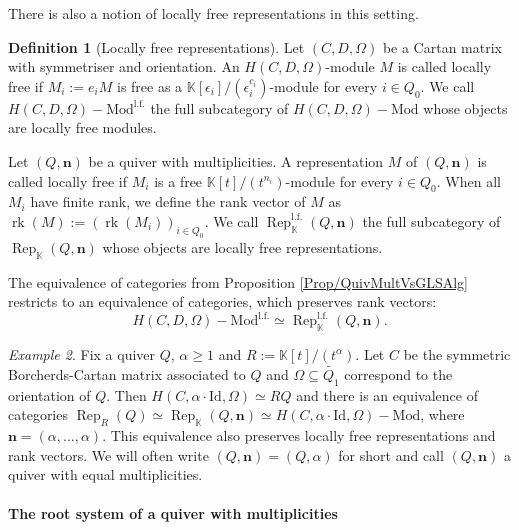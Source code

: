 \documentclass[11pt,english]{article}
\numberwithin{equation}{section}
\numberwithin{figure}{section}
\theoremstyle{definition}
\newtheorem{df}{Definition}[subsection]
\theoremstyle{plain}
\theoremstyle{remark}
\newtheorem{exmp}[df]{Example}
\DeclareMathOperator{\rk}{rk}
\DeclareMathOperator{\Rep}{Rep}
\newcommand\nn{\mathbf{n}}
\newcommand\KK{\mathbb{K}}
\begin{document}
There is also a notion of locally free representations in this setting.

\begin{df}[Locally free representations]

Let $(C,D,\Omega)$ be a Cartan matrix with symmetriser and orientation.
An $H(C,D,\Omega)$-module $M$ is called locally free if $M_{i}:=e_{i}M$
is free as a $\KK[\epsilon_{i}]/(\epsilon_{i}^{c_{i}})$-module for
every $i\in Q_{0}$. We call $H(C,D,\Omega)-\mathrm{Mod}^{\mathrm{l.f.}}$
the full subcategory of $H(C,D,\Omega)-\mathrm{Mod}$ whose objects
are locally free modules.

Let $(Q,\mathbf{n})$ be a quiver with multiplicities. A representation
$M$ of $(Q,\mathbf{n})$ is called locally free if $M_{i}$ is a
free $\KK[t]/(t^{n_{i}})$-module for every $i\in Q_{0}$. When all
$M_{i}$ have finite rank, we define the rank vector of $M$ as $\rk(M):=(\rk(M_{i}))_{i\in Q_{0}}$.
We call $\Rep_{\KK}^{\mathrm{l.f.}}(Q,\mathbf{n})$ the full subcategory
of $\Rep_{\KK}(Q,\mathbf{n})$ whose objects are locally free representations.

The equivalence of categories from Proposition \ref{Prop/QuivMultVsGLSAlg}
restricts to an equivalence of categories, which preserves rank vectors:\[
H(C,D,\Omega)-\mathrm{Mod}^{\mathrm{l.f.}}\simeq\Rep_{\KK}^{\mathrm{l.f.}}(Q,\mathbf{n}).
\]

\end{df}

\begin{exmp}

Fix a quiver $Q$, $\alpha\geq1$ and $R:=\KK[t]/(t^{\alpha})$. Let
$C$ be the symmetric Borcherds-Cartan matrix associated to $Q$ and
$\Omega\subseteq\tilde{Q_{1}}$ correspond to the orientation of $Q$.
Then $H(C,\alpha\cdot\mathrm{Id},\Omega)\simeq RQ$ and there is an
equivalence of categories $\Rep_{R}(Q)\simeq\Rep_{\KK}(Q,\mathbf{n})\simeq H(C,\alpha\cdot\mathrm{Id},\Omega)-\mathrm{Mod}$,
where $\nn=(\alpha,\ldots,\alpha)$. This equivalence also preserves
locally free representations and rank vectors. We will often write
$(Q,\mathbf{n})=(Q,\alpha)$ for short and call $(Q,\mathbf{n})$
a quiver with equal multiplicities.

\end{exmp}

\paragraph*{The root system of a quiver with multiplicities}
\end{document}
